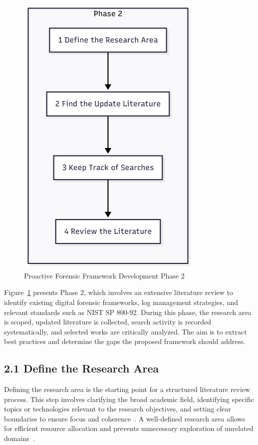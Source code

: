 \begin{figure}[H]
    \centering
    \includegraphics[height=14cm]{figure/framework-development-phase-2.png}
    \caption{Proactive Forensic Framework Development Phase 2}
    \label{fig:framework-development-phase-2}
\end{figure}
Figure~\ref{fig:framework-development-phase-2} presents Phase 2, which involves an extensive literature review to identify existing digital forensic frameworks, log management strategies, and relevant standards such as NIST SP 800-92. During this phase, the research area is scoped, updated literature is collected, search activity is recorded systematically, and selected works are critically analyzed. The aim is to extract best practices and determine the gaps the proposed framework should address.

\subsection{2.1 Define the Research Area}

Defining the research area is the starting point for a structured literature review process. This step involves clarifying the broad academic field, identifying specific topics or technologies relevant to the research objectives, and setting clear boundaries to ensure focus and coherence~\cite{booth2021systematic}. A well-defined research area allows for efficient resource allocation and prevents unnecessary exploration of unrelated domains~\cite{webster2002analyzing}.

